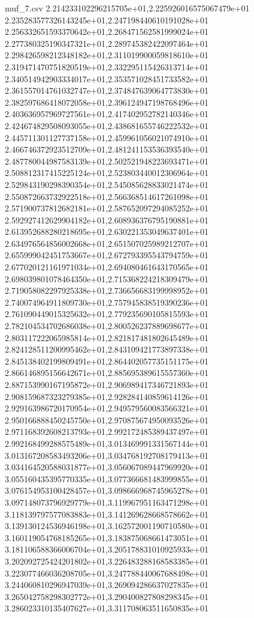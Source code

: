 \begin{filecontents*}{muf_7.csv}
2.214233102296215705e+01,2.225926016575067479e+01
2.235283577326143245e+01,2.247198440610191028e+01
2.256332651593370642e+01,2.268471562581999024e+01
2.277380325190347321e+01,2.289745382422097464e+01
2.298426598212348182e+01,2.311019900059818610e+01
2.319471470751820519e+01,2.332295115426313714e+01
2.340514942903334017e+01,2.353571028451733582e+01
2.361557014761032747e+01,2.374847639064773830e+01
2.382597686418072058e+01,2.396124947198768496e+01
2.403636957969727561e+01,2.417402952782140346e+01
2.424674829508093055e+01,2.438681655746222532e+01
2.445711301127737158e+01,2.459961056021074910e+01
2.466746372923512709e+01,2.481241153536393540e+01
2.487780044987583139e+01,2.502521948223693471e+01
2.508812317415225124e+01,2.523803440012306964e+01
2.529843190298390354e+01,2.545085628833021474e+01
2.550872663732922518e+01,2.566368514617261098e+01
2.571900737812682181e+01,2.587652097294085252e+01
2.592927412629904182e+01,2.608936376795190881e+01
2.613952688280218695e+01,2.630221353049637401e+01
2.634976564856002668e+01,2.651507025989212707e+01
2.655999042451753667e+01,2.672793395543794759e+01
2.677020121161971034e+01,2.694080461643170565e+01
2.698039801078464350e+01,2.715368224218309479e+01
2.719058082297925338e+01,2.736656683199998952e+01
2.740074964911809730e+01,2.757945838519390236e+01
2.761090449015325632e+01,2.779235690105815593e+01
2.782104534702686038e+01,2.800526237889698677e+01
2.803117222065985814e+01,2.821817481802645489e+01
2.824128511200995462e+01,2.843109421773897338e+01
2.845138402199809491e+01,2.864402057735151175e+01
2.866146895156642671e+01,2.885695389615557360e+01
2.887153990167195872e+01,2.906989417346721893e+01
2.908159687323279385e+01,2.928284140859614126e+01
2.929163986720170954e+01,2.949579560083566321e+01
2.950166888450245750e+01,2.970875674950093526e+01
2.971168392608213793e+01,2.992172485389437497e+01
2.992168499288575489e+01,3.013469991331567144e+01
3.013167208583493206e+01,3.034768192708179413e+01
3.034164520588031877e+01,3.056067089447969920e+01
3.055160435395770335e+01,3.077366681483999855e+01
3.076154953100428457e+01,3.098666968745965278e+01
3.097148073796929779e+01,3.119967951163471298e+01
3.118139797577083883e+01,3.141269628668578662e+01
3.139130124536946198e+01,3.162572001190710580e+01
3.160119054768185265e+01,3.183875068661473051e+01
3.181106588366006704e+01,3.205178831010925933e+01
3.202092725424201802e+01,3.226483288168583385e+01
3.223077466036208705e+01,3.247788440067688498e+01
3.244060810296947039e+01,3.269094286637027835e+01
3.265042758298302772e+01,3.290400827808298345e+01
3.286023310135407627e+01,3.311708063511650835e+01

\end{filecontents*}
